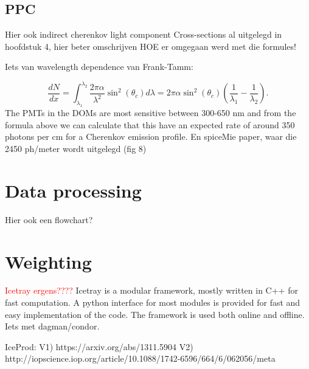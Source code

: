 \subsection{PPC}
Hier ook indirect cherenkov light component
Cross-sections al uitgelegd in hoofdstuk 4, hier beter omschrijven HOE er omgegaan werd met die formules!

Iets van wavelength dependence van Frank-Tamm:

\begin{equation}
\frac{dN}{dx} = \int_{\lambda_1}^{\lambda_2} \frac{2 \pi \alpha}{\lambda^2} \sin^2 \left(\theta_c\right) d\lambda = 2\pi \alpha \sin^2 \left(\theta_c\right) \left(\frac{1}{\lambda_1} -\frac{1}{\lambda_2}\right).
\end{equation}
The PMTs in the DOMs are most sensitive between 300-650 nm and from the formula above we can calculate that this have an expected rate of around 350 photons per cm for a Cherenkov emission profile. En spiceMie paper, waar die 2450 ph/meter wordt uitgelegd (fig 8)

\section{Data processing}
Hier ook een flowchart?
\section{Weighting}
\label{sec:weighting}



\textcolor{red}{Icetray ergens????}
Icetray is a modular framework, mostly written in C++ for fast computation. A python interface for most modules is provided for fast and easy implementation of the code. The framework is used both online and offline.
Iets met dagman/condor.

IceProd:
V1) https://arxiv.org/abs/1311.5904
V2) http://iopscience.iop.org/article/10.1088/1742-6596/664/6/062056/meta

